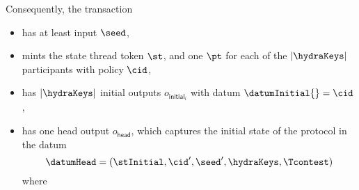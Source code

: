 \noindent Consequently, the \mtxInit{} transaction
\begin{itemize}
  \item has at least input $\seed$,
  \item mints the state thread token $\st$, and one $\pt$ for each of the $|\hydraKeys|$
  participants with policy $\cid$,
  \item has $|\hydraKeys|$ initial outputs $o_{\mathsf{initial}_{i}}$ with datum $\datumInitial{} = \cid$,
  \item has one head output
  $o_{\mathsf{head}}$, which captures
  the initial state of the protocol in the datum
  \[
	\datumHead = (\stInitial,\cid',\seed',\hydraKeys,\Tcontest)
  \]
  where
\end{itemize}

